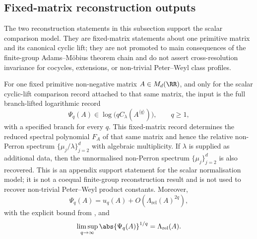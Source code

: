 \subsection{Fixed-matrix reconstruction outputs}

The two reconstruction statements in this subsection support the scalar
comparison model.  They are fixed-matrix
statements about one primitive matrix and its canonical cyclic lift; they are
not promoted to main consequences of the finite-group Adams--M\"obius
theorem chain and do not assert cross-resolution invariance for cocycles,
extensions, or non-trivial Peter--Weyl class profiles.

\begin{proposition}
  \label{thm:finite-part-cyclic-lift-spectrum-identifiability}
  \label{thm:intro-cyclic-reconstruction}
  For one fixed primitive non-negative matrix \(A\in M_d(\RR)\), and only
  for the scalar cyclic-lift comparison record attached to that same matrix,
  the input is the full branch-lifted logarithmic record
  \[
    \Psi_q(A)\in \log\!\bigl(qC_\lambda(A^{\langle q\rangle})\bigr),
    \qquad q\ge1,
  \]
  with a specified branch for every \(q\). This fixed-matrix record
  determines the reduced spectral polynomial \(F_A\) of that same matrix and hence the
  relative non-Perron spectrum \(\{\mu_j/\lambda\}_{j=2}^d\) with
  algebraic multiplicity. If \(\lambda\) is supplied as additional data,
  then the unnormalised non-Perron spectrum \(\{\mu_j\}_{j=2}^d\) is also
  recovered.  This is an appendix support statement for the scalar
  normalisation model; it is not a coequal finite-group reconstruction result
  and is not used to recover non-trivial Peter--Weyl product constants.
  Moreover,
  \[
    \Psi_q(A)=u_q(A)+O\!\left(\Lambda_{\mathrm{rel}}(A)^{2q}\right),
  \]
  with the explicit bound from
  , and
  \[
    \limsup_{q\to\infty}\abs{\Psi_q(A)}^{1/q}
    =\Lambda_{\mathrm{rel}}(A).
  \]
\end{proposition}

